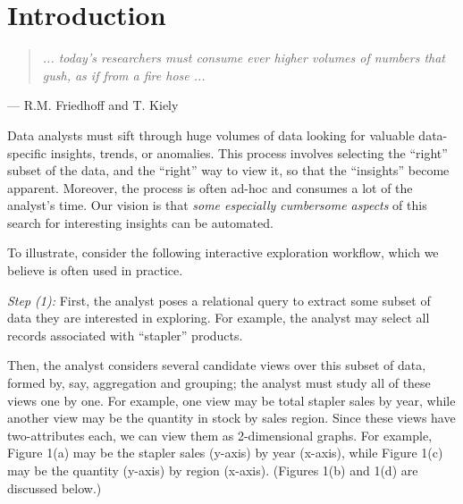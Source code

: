 \section{Introduction}\label{sec:intro}
\vspace{-10pt}
\begin{quote} {\em
... today's researchers must consume ever higher volumes 
of numbers that gush, as if from a fire hose ... 
}
\end{quote}
\vspace{-7 pt}
\noindent \hspace{80pt} --- R.M. Friedhoff and T. Kiely
\smallskip

Data analysts must sift through huge volumes of data
looking for valuable data-specific insights, trends, or anomalies.
This process involves selecting the ``right'' subset of the data,
and the ``right'' way to view it, so that the ``insights'' become apparent.
Moreover, the process is often ad-hoc and consumes a lot of the analyst's time.
Our vision is that {\em some especially cumbersome aspects} of this search 
for interesting insights can be automated.

To illustrate, consider the following interactive exploration workflow,
which we believe is often used in practice.

\noindent 
{\em Step (1):} First, the analyst poses a relational query 
to extract some subset of data they are interested in exploring.
For example, the analyst may select all records associated with
``stapler'' products.





 Then, the analyst considers several candidate views 
over this subset of data, formed by, say, aggregation and grouping;
the analyst must study all of these views one by one.
For example, one view may be total stapler sales by year,
while another view may be the quantity in stock by sales region.
Since these views have two-attributes each, we can view them
as 2-dimensional graphs. 
For example, Figure 1(a) may be the stapler sales (y-axis) by year (x-axis),
while Figure 1(c) may be the quantity (y-axis) by region (x-axis).
(Figures 1(b) and 1(d) are discussed below.)





